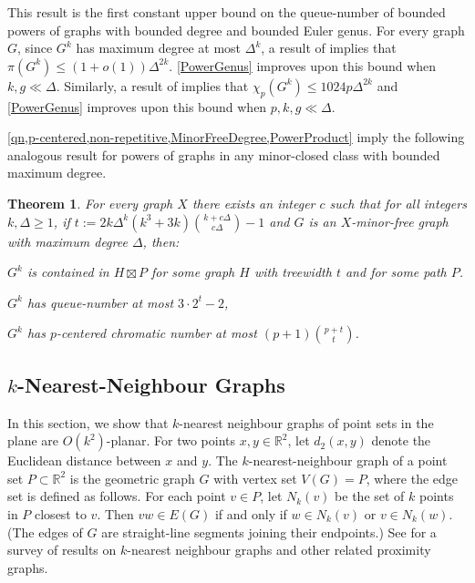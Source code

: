 \documentclass{patmorin}
\theoremstyle{plain}
\newtheorem{thm}{Theorem}
\theoremstyle{definition}
\newcommand{\note}[2]{\noindent{\color{red}[#1:~#2]}}
\renewcommand{\le}{\leqslant}
\renewcommand{\geq}{\geqslant}
\renewcommand{\leq}{\leqslant}
\newcommand{\R}{\mathbb{R}}
\begin{document}
\note{DW}{\cref{PowerGenus} has been updated}

This result is the first constant upper bound on the queue-number of bounded powers of graphs with bounded degree and bounded Euler genus.  For every graph $G$, since $G^k$ has maximum degree at most $\Delta^k$, a result of \citet{DJKW16} implies that $\pi(G^k) \leq (1+o(1))\Delta^{2k}$. \cref{PowerGenus} improves upon this bound when $k,g\ll\Delta$.  Similarly, a result of \citet{DFMS21} implies that $\chi_p(G^k)\le 1024p\Delta^{2k}$ and \cref{PowerGenus} improves upon this bound when $p,k,g\ll\Delta$.

\cref{qn,p-centered,non-repetitive,MinorFreeDegree,PowerProduct} imply the following analogous result for powers of graphs in any minor-closed class with bounded maximum degree.

\begin{thm}
\label{PowerMinor}
For every graph $X$ there exists an integer $c$ such that for all integers $k,\Delta\geq 1$, if $t:= 2k\Delta^{k}(k^3+3k)\binom{k+c\Delta}{c\Delta}-1$ and $G$ is an $X$-minor-free graph with maximum degree $\Delta$, then:
\begin{compactitem}
	\item $G^k$ is contained in $H\boxtimes P$ for some graph $H$ with treewidth $t$ and for some path $P$.
	\item $G^k$ has queue-number at most $3\cdot 2^t-2$,
	\item $G^k$ has $p$-centered chromatic number at most $(p+1)\binom{p+t}{t}$.
\end{compactitem}
\end{thm}

\subsection{$k$-Nearest-Neighbour Graphs}

In this section, we show that $k$-nearest neighbour graphs of point sets in the plane are $O(k^2)$-planar.  For two points $x,y\in\R^2$, let $d_2(x,y)$ denote the Euclidean distance between $x$ and $y$. The $k$-nearest-neighbour graph of a point set $P\subset\R^2$ is the geometric graph $G$ with vertex set $V(G)=P$, where the edge set is defined as follows. For each point $v\in P$, let $N_k(v)$ be the set of $k$ points in $P$ closest to $v$. Then $vw\in E(G)$ if and only if $w\in N_k(v)$ or $v\in N_k(w)$. (The edges of $G$ are straight-line segments joining their endpoints.) See \citep{ProximityGraphs} for a survey of results on $k$-nearest neighbour graphs and other related proximity graphs.
\end{document}
